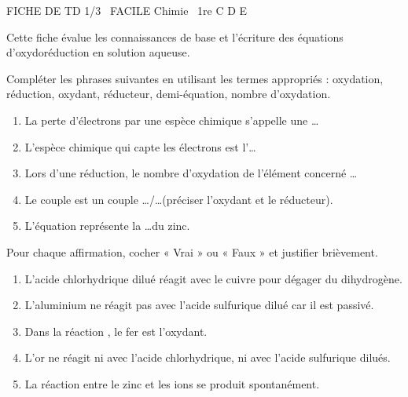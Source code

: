 \documentclass[11pt]{article}
\begin{document}
\begin{tcolorbox}[enhanced,colback=popink,colframe=popink,arc=10pt,boxrule=0pt,left=12pt,right=12pt,top=9pt,bottom=9pt]
{\color{white}\popxbold\small FICHE DE TD 1/3 \textbullet\ FACILE \hfill Chimie \textbullet\ 1re C D E\par}
\end{tcolorbox}
\vspace{4pt}
Cette fiche évalue les connaissances de base et l'écriture des équations d'oxydoréduction en solution aqueuse.

\begin{exercice}
Compléter les phrases suivantes en utilisant les termes appropriés : oxydation, réduction, oxydant, réducteur, demi-équation, nombre d'oxydation.
\begin{enumerate}
    \item La perte d'électrons par une espèce chimique s'appelle une \ldots
    \item L'espèce chimique qui capte les électrons est l'\ldots
    \item Lors d'une réduction, le nombre d'oxydation de l'élément concerné \ldots
    \item Le couple  est un couple \ldots/\ldots (préciser l'oxydant et le réducteur).
    \item L'équation  représente la \ldots du zinc.
\end{enumerate}
\end{exercice}

\begin{exercice}
Pour chaque affirmation, cocher « Vrai » ou « Faux » et justifier brièvement.
\begin{enumerate}
    \item L'acide chlorhydrique dilué réagit avec le cuivre pour dégager du dihydrogène.
    \item L'aluminium ne réagit pas avec l'acide sulfurique dilué car il est passivé.
    \item Dans la réaction , le fer est l'oxydant.
    \item L'or ne réagit ni avec l'acide chlorhydrique, ni avec l'acide sulfurique dilués.
    \item La réaction entre le zinc et les ions  se produit spontanément.
\end{enumerate}
\end{exercice}
\end{document}
